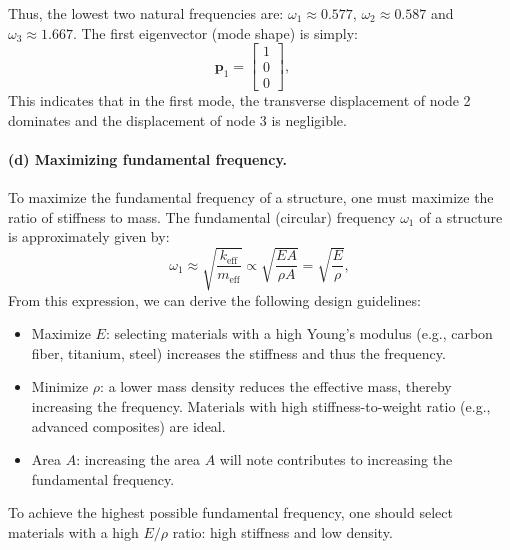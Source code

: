 \documentclass[12pt]{article}
\begin{document}
Thus, the lowest two natural frequencies are: $\omega_1 \approx 0.577$, $\omega_2  \approx 0.587$ and $\omega_3  \approx 1.667$. The first eigenvector (mode shape) is simply:
\[
	\mathbf p_1 = \begin{bmatrix} 1 \\ 0 \\ 0 \end{bmatrix}, \quad
\]
This indicates that in the first mode, the transverse displacement of node 2 dominates and the displacement of node 3 is negligible.


\paragraph*{(d) Maximizing fundamental frequency.} To maximize the fundamental frequency of a structure, one must maximize the ratio of stiffness to mass. The fundamental (circular) frequency \( \omega_1 \) of a structure is approximately given by:
\[
	\omega_1 \approx \sqrt{\frac{k_{\text{eff}}}{m_{\text{eff}}}} \propto \sqrt{\frac{EA}{\rho A}} = \sqrt{\frac{E}{\rho}},
\]
From this expression, we can derive the following design guidelines:
\begin{itemize}
	\item Maximize \( E \): selecting materials with a high Young's modulus (e.g., carbon fiber, titanium, steel) increases the stiffness and thus the frequency.
	\item Minimize \( \rho \): a lower mass density reduces the effective mass, thereby increasing the frequency. Materials with high stiffness-to-weight ratio (e.g., advanced composites) are ideal.
	\item Area \( A \): increasing the area \( A \) will note contributes to increasing the fundamental frequency.
\end{itemize}
To achieve the highest possible fundamental frequency, one should select materials with a high \( E/\rho \) ratio: high stiffness and low density.
\end{document}
